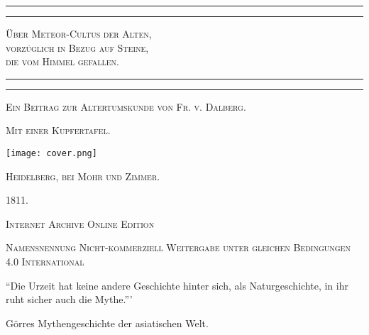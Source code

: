 \documentclass[a4paper, 11pt, oneside, polutonikogreek, german]{article}
\begin{document}
\begin{titlepage} %
	\centering %

	
	\rule{\textwidth}{1.6pt}\vspace*{-\baselineskip}\vspace*{2pt} %
	\rule{\textwidth}{0.4pt} %
	
	{\scshape\LARGE Über Meteor-Cultus der Alten,\\[1.25pt] vorzüglich in Bezug auf Steine,\\[1.25pt] die vom Himmel gefallen.\\[1.25pt]}
	
	\rule{\textwidth}{0.4pt}\vspace*{-\baselineskip}\vspace{3.2pt} %
	\rule{\textwidth}{1.6pt} %

	
	{\scshape Ein Beitrag zur Altertumskunde von Fr. v. Dalberg.} %
	
    {\scshape\scriptsize Mit einer Kupfertafel.} %
    
	
	\texttt{[image: cover.png]}
	
    \vspace*{\fill}

	\vspace{1\baselineskip}

	{\small\scshape Heidelberg, bei Mohr und Zimmer.}
	
	{\small\scshape{1811.}}
	
	\vspace{0.5\baselineskip} %

    \scshape Internet Archive Online Edition  %
	
	{\scshape\small Namensnennung Nicht-kommerziell Weitergabe unter gleichen Bedingungen 4.0 International} %
\end{titlepage}
\setlength{\parskip}{1mm plus1mm minus1mm}
\clearpage
\vspace*{\fill}
\begin{center}
"`Die Urzeit hat keine andere Geschichte hinter sich, als Naturgeschichte, in ihr ruht sicher auch die Mythe."''
\end{center}
\begin{center}
Görres Mythengeschichte der asiatischen Welt.
\end{center}
\vspace*{\fill}
\clearpage
\end{document}
